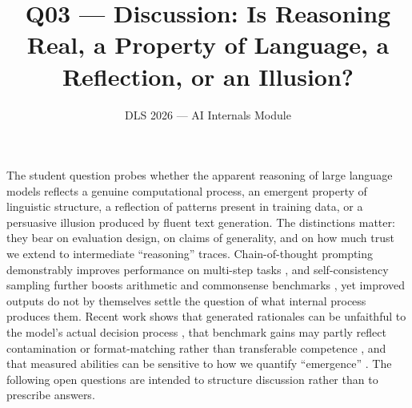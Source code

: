 \documentclass[11pt]{article}
\title{Q03 --- Discussion: Is Reasoning Real, a Property of Language, a Reflection, or an Illusion?}
\author{DLS 2026 --- AI Internals Module}
\date{}
\begin{document}
\maketitle

\noindent
The student question probes whether the apparent reasoning of large language models reflects a genuine computational process, an emergent property of linguistic structure, a reflection of patterns present in training data, or a persuasive illusion produced by fluent text generation. The distinctions matter: they bear on evaluation design, on claims of generality, and on how much trust we extend to intermediate ``reasoning'' traces. Chain-of-thought prompting demonstrably improves performance on multi-step tasks \citep{wei2022chain}, and self-consistency sampling further boosts arithmetic and commonsense benchmarks \citep{wang2022selfconsistency}, yet improved outputs do not by themselves settle the question of what internal process produces them. Recent work shows that generated rationales can be unfaithful to the model's actual decision process \citep{turpin2023language}, that benchmark gains may partly reflect contamination or format-matching rather than transferable competence \citep{srivastava2023beyond}, and that measured abilities can be sensitive to how we quantify ``emergence'' \citep{schaeffer2023emergent}. The following open questions are intended to structure discussion rather than to prescribe answers.
\end{document}
